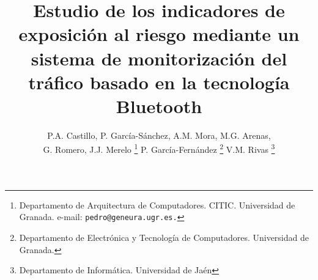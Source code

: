 \documentclass[twocolumn,twoside]{Jornadas}
\begin{document}
\title{Estudio de los indicadores de exposición al riesgo mediante un sistema de monitorización del tráfico basado en la tecnología Bluetooth}  

\author{%
	P.A. Castillo, P. García-Sánchez, A.M. Mora, M.G. Arenas, \\ G. Romero, J.J. Merelo
     \thanks{Departamento de Arquitectura de Computadores. CITIC. Universidad de Granada.
	e-mail: {\tt pedro@geneura.ugr.es.}}
	P. García-Fernández
     \thanks{Departamento de Electrónica y Tecnología de Computadores. Universidad de Granada.}
	V.M. Rivas
     \thanks{Departamento de Informática. Universidad de Jaén}
}


\maketitle
\markboth{}{}
\pagestyle{empty} 
\thispagestyle{empty} %
\end{document}
